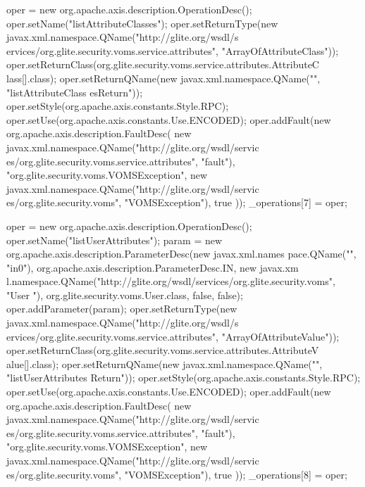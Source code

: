 \begin{DoxyCode}
{        oper = new org.apache.axis.description.OperationDesc();
        oper.setName("listAttributeClasses");
        oper.setReturnType(new javax.xml.namespace.QName("http://glite.org/wsdl/s
      ervices/org.glite.security.voms.service.attributes", "ArrayOfAttributeClass"));
        oper.setReturnClass(org.glite.security.voms.service.attributes.AttributeC
      lass[].class);
        oper.setReturnQName(new javax.xml.namespace.QName("", "listAttributeClass
      esReturn"));
        oper.setStyle(org.apache.axis.constants.Style.RPC);
        oper.setUse(org.apache.axis.constants.Use.ENCODED);
        oper.addFault(new org.apache.axis.description.FaultDesc(
                      new javax.xml.namespace.QName("http://glite.org/wsdl/servic
      es/org.glite.security.voms.service.attributes", "fault"),
                      "org.glite.security.voms.VOMSException",
                      new javax.xml.namespace.QName("http://glite.org/wsdl/servic
      es/org.glite.security.voms", "VOMSException"), 
                      true
                     ));
        _operations[7] = oper;

        oper = new org.apache.axis.description.OperationDesc();
        oper.setName("listUserAttributes");
        param = new org.apache.axis.description.ParameterDesc(new javax.xml.names
      pace.QName("", "in0"), org.apache.axis.description.ParameterDesc.IN, new javax.xm
      l.namespace.QName("http://glite.org/wsdl/services/org.glite.security.voms", "User
      "), org.glite.security.voms.User.class, false, false);
        oper.addParameter(param);
        oper.setReturnType(new javax.xml.namespace.QName("http://glite.org/wsdl/s
      ervices/org.glite.security.voms.service.attributes", "ArrayOfAttributeValue"));
        oper.setReturnClass(org.glite.security.voms.service.attributes.AttributeV
      alue[].class);
        oper.setReturnQName(new javax.xml.namespace.QName("", "listUserAttributes
      Return"));
        oper.setStyle(org.apache.axis.constants.Style.RPC);
        oper.setUse(org.apache.axis.constants.Use.ENCODED);
        oper.addFault(new org.apache.axis.description.FaultDesc(
                      new javax.xml.namespace.QName("http://glite.org/wsdl/servic
      es/org.glite.security.voms.service.attributes", "fault"),
                      "org.glite.security.voms.VOMSException",
                      new javax.xml.namespace.QName("http://glite.org/wsdl/servic
      es/org.glite.security.voms", "VOMSException"), 
                      true
                     ));
        _operations[8] = oper;

}
\end{DoxyCode}
